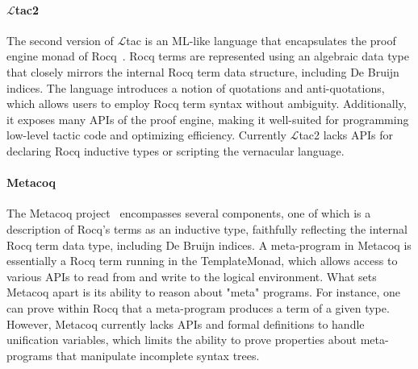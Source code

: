 \documentclass[sigplan,natbib=false]{acmart}
\begin{document}
\paragraph{
$\mathcal{L}$tac2} The second version of $\mathcal{L}$tac is an ML-like language that encapsulates the proof engine
monad of Rocq~\cite{10.1145/1090189.1086390}. Rocq terms are represented using
an algebraic data type that closely mirrors the internal Rocq term data
structure, including De Bruijn indices. The language introduces a notion of
quotations and anti-quotations, which allows users to employ Rocq term syntax
without ambiguity. Additionally, it exposes many APIs of the proof engine,
making it well-suited for programming low-level tactic code and optimizing
efficiency. Currently $\mathcal{L}$tac2 lacks APIs for declaring Rocq inductive
types or scripting the vernacular language.

\paragraph{Metacoq}
The Metacoq project~\cite{sozeau:hal-02167423} encompasses several components,
one of which is a description of Rocq's terms as an inductive type, faithfully
reflecting the internal Rocq term data type, including De Bruijn indices. A
meta-program in Metacoq is essentially a Rocq term running in the
TemplateMonad, which allows access to various APIs to read from and write to
the logical environment. What sets Metacoq apart is its
ability to reason about "meta" programs. For instance, one can prove within
Rocq that a meta-program produces a term of a given type. However, Metacoq
currently lacks APIs and formal definitions to handle unification variables,
which limits the ability to prove properties about meta-programs that
manipulate incomplete syntax trees.
\end{document}
